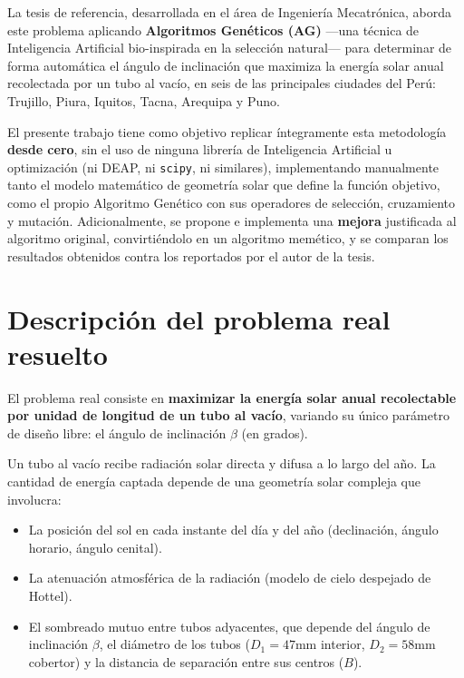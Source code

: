\documentclass[11pt,a4paper]{article}
\begin{document}
La tesis de referencia, desarrollada en el área de Ingeniería Mecatrónica,
aborda este problema aplicando \textbf{Algoritmos Genéticos (AG)} —una técnica
de Inteligencia Artificial bio-inspirada en la selección natural— para
determinar de forma automática el ángulo de inclinación que maximiza la
energía solar anual recolectada por un tubo al vacío, en seis de las
principales ciudades del Perú: Trujillo, Piura, Iquitos, Tacna, Arequipa y
Puno.

El presente trabajo tiene como objetivo replicar íntegramente esta
metodología \textbf{desde cero}, sin el uso de ninguna librería de
Inteligencia Artificial u optimización (ni DEAP, ni \texttt{scipy}, ni
similares), implementando manualmente tanto el modelo matemático de geometría
solar que define la función objetivo, como el propio Algoritmo Genético con
sus operadores de selección, cruzamiento y mutación. Adicionalmente, se
propone e implementa una \textbf{mejora} justificada al algoritmo original,
convirtiéndolo en un algoritmo memético, y se comparan los resultados
obtenidos contra los reportados por el autor de la tesis.

\section{Descripción del problema real resuelto}

El problema real consiste en \textbf{maximizar la energía solar anual
recolectable por unidad de longitud de un tubo al vacío}, variando su único
parámetro de diseño libre: el ángulo de inclinación $\beta$ (en grados).

Un tubo al vacío recibe radiación solar directa y difusa a lo largo del año.
La cantidad de energía captada depende de una geometría solar compleja que
involucra:

\begin{itemize}[nosep]
  \item La posición del sol en cada instante del día y del año (declinación,
        ángulo horario, ángulo cenital).
  \item La atenuación atmosférica de la radiación (modelo de cielo despejado
        de Hottel).
  \item El sombreado mutuo entre tubos adyacentes, que depende del ángulo de
        inclinación $\beta$, el diámetro de los tubos ($D_1=47$mm interior,
        $D_2=58$mm cobertor) y la distancia de separación entre sus centros
        ($B$).
\end{itemize}
\end{document}
